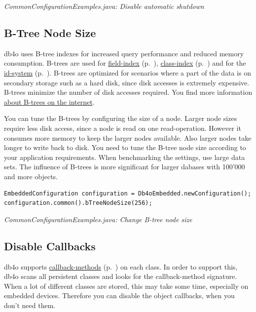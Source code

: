 {\small\itshape CommonConfigurationExamples.java: Disable automatic shutdown\par}
\medskip

\subsection{B-Tree Node Size}
\label{ref:configuration-common-btree-node-size}

db4o uses B-tree indexes for increased query performance and reduced memory consumption. B-trees are used for \hyperref[ref:configuration-objectfield-configuration]{field-index} (p.~\pageref{ref:configuration-objectfield-configuration}), \hyperref[ref:configuration-objectclass-diable-class-index]{class-index} (p.~\pageref{ref:configuration-objectclass-diable-class-index}) and for the \hyperref[ref:configuration-id-system]{id-system} (p.~\pageref{ref:configuration-id-system}). B-trees are optimized for scenarios where a part of the data is on secondary storage such as a hard disk, since disk accesses is extremely expensive. B-trees minimize the number of disk accesses required. You find more information \href{http://en.wikipedia.org/wiki/B-tree}{about B-trees on the internet}.

You can tune the B-trees by configuring the size of a node. Larger node sizes require less disk access, since a node is read on one read-operation. However it consumes more memory to keep the larger nodes available. Also larger nodes take longer to write back to disk. You need to tune the B-tree node size according to your application requirements. When benchmarking the settings, use large data sets. The influence of B-trees is more significant for larger dabases with 100'000 and more objects.

\begin{lstlisting}
EmbeddedConfiguration configuration = Db4oEmbedded.newConfiguration();
configuration.common().bTreeNodeSize(256);
\end{lstlisting}

{\small\itshape CommonConfigurationExamples.java: Change B-tree node size\par}
\medskip

\subsection{Disable Callbacks}
\label{ref:configuration-common-no-callbacks}

db4o supports \hyperref[ref:advanced-topics-callbacks]{callback-methods} (p.~\pageref{ref:advanced-topics-callbacks}) on each class. In order to support this, db4o scans all persistent classes and looks for the callback-method signature. When a lot of different classes are stored, this may take some time, especially on embedded devices. Therefore you can disable the object callbacks, when you don't need them.

